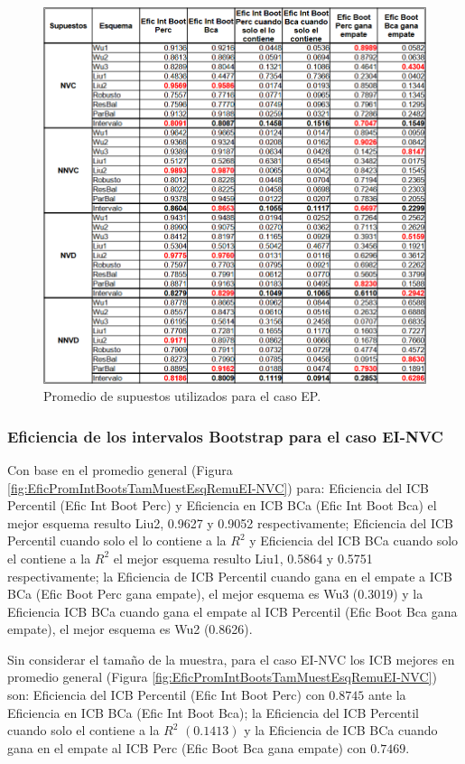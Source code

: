 \begin{figure}[ht] 
	\centering 
	\includegraphics[width=0.80\linewidth]{img/EP_Prom_Supuestos.png} 
	\caption{Promedio de supuestos utilizados para el caso EP.} 
	\label{fig:PromSupuUtiliEP}
\end{figure}
\FloatBarrier



\subsubsection{Eficiencia de los intervalos Bootstrap para el caso EI-NVC}
Con base en el promedio general (Figura \ref{fig:EficPromIntBootsTamMuestEsqRemuEI-NVC}) para: Eficiencia del ICB Percentil (Efic Int Boot Perc) y Eficiencia en ICB BCa (Efic Int Boot Bca) el mejor esquema resulto Liu2, 0.9627 y 0.9052 respectivamente;
 Eficiencia del ICB Percentil cuando solo el lo contiene a la $R^{2}$ y Eficiencia del ICB BCa cuando solo el contiene a la $R^{2}$ el mejor esquema resulto Liu1, 0.5864 y 0.5751 respectivamente; 
 la Eficiencia de ICB Percentil cuando gana en el empate a ICB BCa (Efic Boot Perc gana empate), el mejor esquema es Wu3 (0.3019) y la Eficiencia ICB BCa cuando gana el empate al ICB Percentil (Efic Boot Bca gana empate), el mejor esquema es Wu2 (0.8626).
\vspace{.5cm}


Sin considerar el tamaño de la muestra, para el caso EI-NVC los ICB mejores en promedio general (Figura \ref{fig:EficPromIntBootsTamMuestEsqRemuEI-NVC}) son: Eficiencia del ICB Percentil (Efic Int Boot Perc) con $0.8745$ ante la Eficiencia en ICB BCa (Efic Int Boot Bca); la Eficiencia del ICB Percentil cuando solo el contiene a la $R^{2}$ $(0.1413)$ y la Eficiencia de ICB BCa cuando gana en el empate al ICB Perc (Efic Boot Bca gana empate) con $0.7469$.

